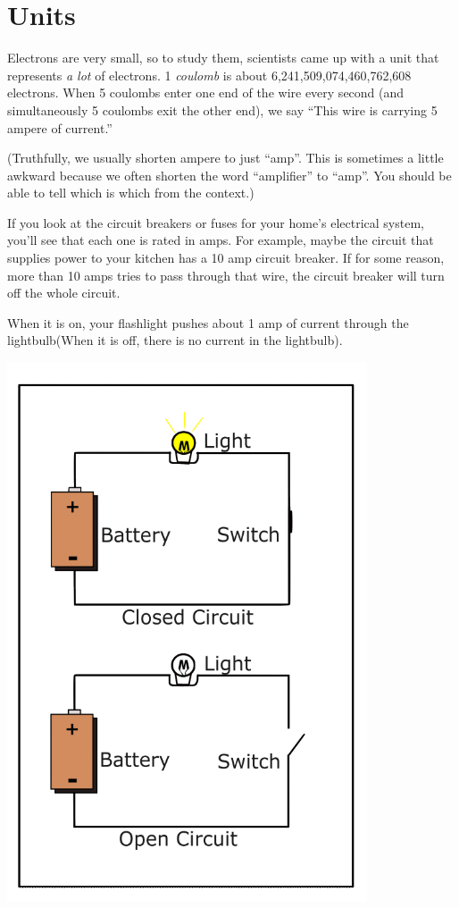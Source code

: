 \section{Units}

Electrons are very small, so to study them, scientists came up with a
unit that represents \textit{a lot} of electrons. 1 \textit{coulomb}
is about 6,241,509,074,460,762,608 electrons.  When 5 coulombs enter one end of the wire every second (and simultaneously 5 coulombs exit the other end), we say ``This wire is carrying 5 ampere of current.''

(Truthfully, we usually shorten ampere to just ``amp''.  This is
sometimes a little awkward because we often shorten the word
``amplifier'' to ``amp''. You should be able to tell which is which
from the context.)

If you look at the circuit breakers or fuses for your home's
electrical system, you'll see that each one is rated in amps.  For
example, maybe the circuit that supplies power to your kitchen has a 10
amp circuit breaker. If for some reason, more than 10 amps tries to
pass through that wire, the circuit breaker will turn off the whole
circuit.

When it is on, your flashlight pushes about 1 amp of current
through the lightbulb(When it is off, there is no current in the
lightbulb).

\includegraphics[width=0.8\textwidth]{Circuit_OnOff.png}

